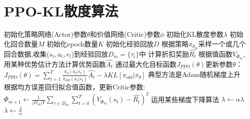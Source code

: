 \documentclass[11pt]{ctexart}
\begin{document}
\section{PPO-KL散度算法}
\begin{algorithm}[H] %
	\renewcommand{\thealgorithm}{} %
	\caption{} 
	\begin{algorithmic}[1] %
		\STATE 初始化策略网络(Actor)参数$\theta$和价值网络(Critic)参数$\phi$
		\STATE 初始化KL散度参数$\lambda$
		\STATE 初始化回合数量$M$
		\STATE 初始化epoch数量$K$
		\STATE 初始化经验回放$D$
			\STATE 根据策略$\pi_{\theta_m}$采样一个或几个回合数据,收集($s_t,a_t,r_t$)到经验回放$D_m=\{\tau_i\}$中
				\STATE 计算折扣奖励$\hat{R_t}$
				\STATE 根据值函数$V_{\Phi_m}$,用某种优势估计方法计算优势函数$\hat{A_t}$
				\STATE 通过最大化目标函数$J_{PPO}(\theta)$更新参数$\theta$：
				\STATE $J_{PPO}(\theta)=\sum_{t=1}^{T}\frac{\pi_\theta(a_t|s_t)}{\pi_{old}(a_t|s_t)}\hat{A_t}-\lambda KL[\pi_{old}|\pi_\theta]$
				\STATE 典型方法是Adam随机梯度上升
				\STATE 根据均方误差回归拟合值函数，更新Critic参数:
				\STATE $\Phi_{m+1} \leftarrow \frac{1}{|D_m|T}\sum_{\tau \in D_m}\sum_{t=0}^{T} (V_{\Phi_{m}}(s_t)-\hat{R_t})^2$
				\STATE 运用某些梯度下降算法
					\STATE $\lambda \leftarrow \alpha\lambda$
					\STATE $\lambda \leftarrow \frac{\lambda}{\alpha}$
				\ENDIF
			\ENDFOR
		\ENDFOR
	\end{algorithmic}
\end{algorithm}

\clearpage
\end{document}
